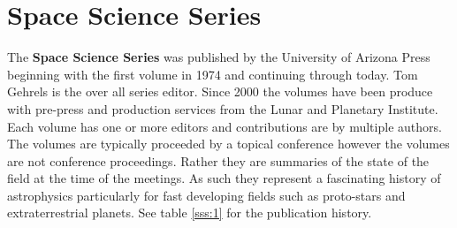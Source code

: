 \section{Space Science Series}

The {\bf Space Science Series} was published by the University of
Arizona Press beginning with the first volume in 1974 and continuing
through today.  Tom Gehrels is the over all series editor. Since 2000
the volumes have been produce with pre-press and production services
from the Lunar and Planetary Institute. Each volume
has one or more editors and contributions are by multiple authors. The
volumes are typically proceeded by a topical conference however the
volumes are not conference proceedings. Rather they are summaries of
the state of the field at the time of the meetings.  As such they
represent a fascinating history of astrophysics particularly for fast
developing fields such as proto-stars and extraterrestrial
planets. See table \ref{sss:1} for the publication history.


